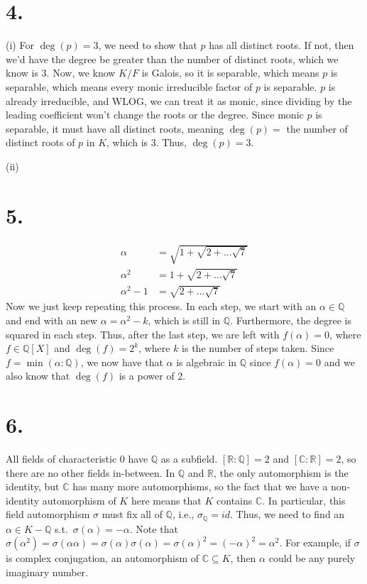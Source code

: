 \documentclass[fleqn]{article}
\begin{document}
    \section{4.}
    (i)
    For $\deg(p) = 3$, we need to show that $p$ has all distinct roots.  If not, then we'd have the degree be greater than the number of distinct roots, which we know is 3.  Now, we know $K/F$ is Galois, so it is separable, which means $p$ is separable, which means every monic irreducible factor of $p$ is separable.  $p$ is already irreducible, and WLOG, we can treat it as monic, since dividing by the leading coefficient won't change the roots or the degree.  Since monic $p$ is separable, it must have all distinct roots, meaning $\deg(p) = $ the number of distinct roots of $p$ in $K$, which is 3.  Thus, $\deg(p) = 3$.
    
    $ $ \\
    (ii)
    
    
    \pagebreak
    
    \section{5.}
    \begin{align}
        \alpha &= \sqrt{1 + \sqrt{2 + ... \sqrt{7}}} \\
        \alpha^2 &= 1 + \sqrt{2 + ... \sqrt{7}} \\
        \alpha^2 - 1 &= \sqrt{2 + ... \sqrt{7}}
    \end{align}
    Now we just keep repeating this process.  In each step, we start with an $\alpha \in \mathbb{Q}$ and end with an new $\alpha = \alpha^2 - k$, which is still in $\mathbb{Q}$.  Furthermore, the degree is squared in each step.  Thus, after the last step, we are left with $f(\alpha) = 0$, where $f \in \mathbb{Q}[X]$ and $\deg(f) = 2^k$, where $k$ is the number of steps taken.  Since $f = \min(\alpha : \mathbb{Q})$, we now have that $\alpha$ is algebraic in $\mathbb{Q}$ since $f(\alpha) = 0$ and we also know that $\deg(f)$ is a power of 2.
    
    \pagebreak
    
    \section{6.}
    All fields of characteristic 0 have $\mathbb{Q}$ as a subfield.  $[\mathbb{R} : \mathbb{Q}] = 2$ and $[\mathbb{C} : \mathbb{R}] = 2$, so there are no other fields in-between.  In $\mathbb{Q}$ and $\mathbb{R}$, the only automorphism is the identity, but $\mathbb{C}$ has many more automorphisms, so the fact that we have a non-identity automorphism of $K$ here means that $K$ contains $\mathbb{C}$.  In particular, this field automorphism $\sigma$ must fix all of $\mathbb{Q}$, i.e., $\sigma_\mathbb{Q} = id$.  Thus, we need to find an $\alpha \in K - \mathbb{Q}$ s.t.\ $\sigma(\alpha) = -\alpha$.  Note that $\sigma(\alpha^2) = \sigma(\alpha \alpha) = \sigma(\alpha) \sigma(\alpha) = \sigma(\alpha)^2 = (-\alpha)^2 = \alpha^2$.  For example, if $\sigma$ is complex conjugation, an automorphism of $\mathbb{C} \subseteq K$, then $\alpha$ could be any purely imaginary number.
    
    
\end{document}
